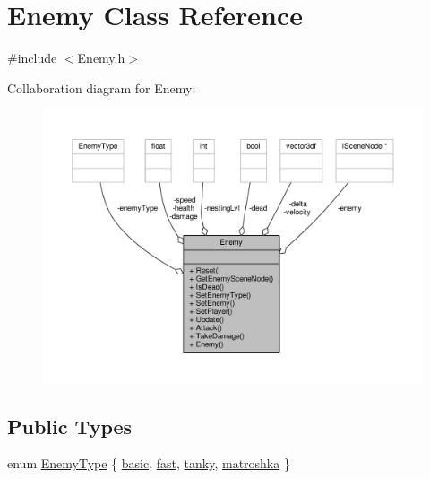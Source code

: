 \hypertarget{class_enemy}{\section{Enemy Class Reference}
\label{class_enemy}
}


{\ttfamily \#include $<$Enemy.\-h$>$}



Collaboration diagram for Enemy\-:
\nopagebreak
\begin{figure}[H]
\begin{center}
\leavevmode
\includegraphics[width=350pt]{class_enemy__coll__graph}
\end{center}
\end{figure}
\subsection*{Public Types}
\begin{DoxyCompactItemize}
\item 
enum \hyperlink{class_enemy_a98c2ee2c2081001de17a4bc9fa8da94f}{Enemy\-Type} \{ \hyperlink{class_enemy_a98c2ee2c2081001de17a4bc9fa8da94fae39ca3e105330b4913cf2d7496d2e49f}{basic}, 
\hyperlink{class_enemy_a98c2ee2c2081001de17a4bc9fa8da94fa227c1851ffd53fcbc3b04e09be3426f7}{fast}, 
\hyperlink{class_enemy_a98c2ee2c2081001de17a4bc9fa8da94fa46f876a597075a60b04ee647a34dfad9}{tanky}, 
\hyperlink{class_enemy_a98c2ee2c2081001de17a4bc9fa8da94fabed20a625942a91cdb7b85a000d8bde8}{matroshka}
 \}
\end{DoxyCompactItemize}
